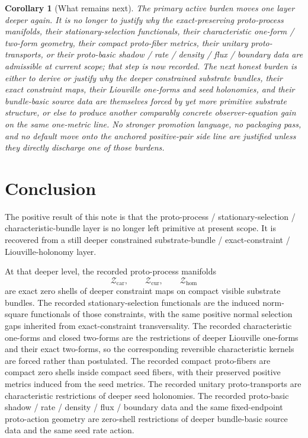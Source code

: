 \documentclass[11pt]{article}
\newcommand{\TensorProtoSpace}{\mathcal Z_{\mathrm{car}}}
\newcommand{\CurProtoSpace}{\mathcal Z_{\mathrm{cur}}}
\newcommand{\HomProtoSpace}{\mathcal Z_{\mathrm{hom}}}
\newtheorem{corollary}{Corollary}
\begin{document}
\begin{corollary}[What remains next]
\label{cor:what_next}
The primary active burden moves one layer deeper again. It is no longer to justify why the exact-preserving proto-process manifolds, their stationary-selection functionals, their characteristic one-form / two-form geometry, their compact proto-fiber metrics, their unitary proto-transports, or their proto-basic shadow / rate / density / flux / boundary data are admissible at current scope; that step is now recorded. The next honest burden is either to derive or justify why the deeper constrained substrate bundles, their exact constraint maps, their Liouville one-forms and seed holonomies, and their bundle-basic source data are themselves forced by yet more primitive substrate structure, or else to produce another comparably concrete observer-equation gain on the same one-metric line. No stronger promotion language, no packaging pass, and no default move onto the anchored positive-pair side line are justified unless they directly discharge one of those burdens.
\end{corollary}

\section{Conclusion}

The positive result of this note is that the proto-process / stationary-selection / characteristic-bundle layer is no longer left primitive at present scope. It is recovered from a still deeper constrained substrate-bundle / exact-constraint / Liouville-holonomy layer.

At that deeper level, the recorded proto-process manifolds
\[
\TensorProtoSpace,\qquad
\CurProtoSpace,\qquad
\HomProtoSpace
\]
are exact zero shells of deeper constraint maps on compact visible substrate bundles. The recorded stationary-selection functionals are the induced norm-square functionals of those constraints, with the same positive normal selection gaps inherited from exact-constraint transversality. The recorded characteristic one-forms and closed two-forms are the restrictions of deeper Liouville one-forms and their exact two-forms, so the corresponding reversible characteristic kernels are forced rather than postulated. The recorded compact proto-fibers are compact zero shells inside compact seed fibers, with their preserved positive metrics induced from the seed metrics. The recorded unitary proto-transports are characteristic restrictions of deeper seed holonomies. The recorded proto-basic shadow / rate / density / flux / boundary data and the same fixed-endpoint proto-action geometry are zero-shell restrictions of deeper bundle-basic source data and the same seed rate action.
\end{document}
